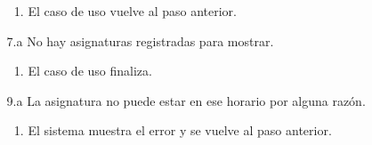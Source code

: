 \documentclass{book}
\begin{document}
\begin{itemize}
\begin{itemize}
		\begin{enumerate}
			\item El caso de uso vuelve al paso anterior.
		\end{enumerate}
		\item[7.a] No hay asignaturas registradas para mostrar.
		\begin{enumerate}
			\item El caso de uso finaliza.
		\end{enumerate}
		\item[9.a] La asignatura no puede estar en ese horario por alguna razón.
		\begin{enumerate}
			\item El sistema muestra el error y se vuelve al paso anterior.
		\end{enumerate}
	\end{itemize}
\end{itemize}

\begin{comment}
\begin{itemize}
\item{\bf Descripción:}
\item{\bf Actores:}
\item{\bf Precondiciones:}
\item{\bf Postcondiciones:}
\item{\bf Escenario principal:}
	\begin{enumerate}
	\item
	\end{enumerate}
\item{\bf Escenarios alternativos:}
	\begin{itemize}
		\item[2.a.]
		\begin{enumerate}
			\item
		\end{enumerate}
	\end{itemize}
\end{itemize}
\end{comment}
\end{document}

